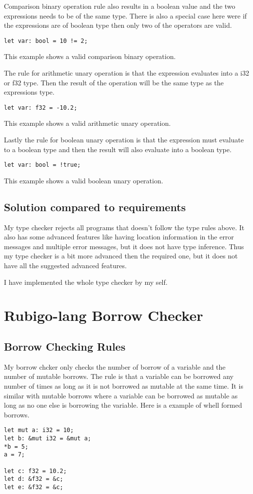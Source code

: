 \documentclass[12pt]{article}
\begin{document}
	Comparison binary operation rule also results in a boolean value and the two expressions needs to be of the same type. There is also a special case here were if the expressions are of boolean type then only two of the operators are valid.
    	\begin{verbatim}
let var: bool = 10 != 2;
    	\end{verbatim}
	This example shows a valid comparison binary operation.
	

	The rule for arithmetic unary operation is that the expression evaluates into a i32 or f32 type. Then the result of the operation will be the same type as the expressions type.
    	\begin{verbatim}
let var: f32 = -10.2;
    	\end{verbatim}
	This example shows a valid arithmetic unary operation.

	Lastly the rule for boolean unary operation is that the expression must evaluate to a boolean type and then the result will also evaluate into a boolean type.
    	\begin{verbatim}
let var: bool = !true;
    	\end{verbatim}
	This example shows a valid boolean unary operation.


	\subsection{Solution compared to requirements}
		My type checker rejects all programs that doesn't follow the type rules above. It also has some advanced features like having location information in the error messages and multiple error messages, but it does not have type inference. Thus my type checker is a bit more advanced then the required one, but it does not have all the suggested advanced features.

		I have implemented the whole type checker by my self.



    \section{Rubigo-lang Borrow Checker}	
    	\subsection{Borrow Checking Rules}
 		My borrow chcker only checks the number of borrow of a variable and the number of mutable borrows. The rule is that a variable can be borrowed any number of times as long as it is not borrowed as mutable at the same time. It is similar with mutable borrows where a variable can be borrowed as mutable as long as no one else is borrowing the variable. Here is a example of whell formed borrows.
	\begin{verbatim}
let mut a: i32 = 10;
let b: &mut i32 = &mut a;
*b = 5;
a = 7;

let c: f32 = 10.2;
let d: &f32 = &c;
let e: &f32 = &c;
    	\end{verbatim}
\end{document}
